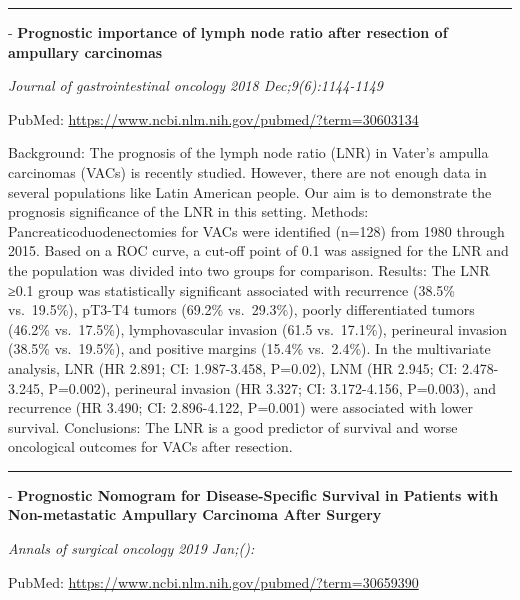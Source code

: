 \documentclass[]{article}
\begin{document}
{}

{}

\begin{center}\rule{0.5\linewidth}{\linethickness}\end{center}

 - \textbf{Prognostic importance of lymph node ratio after resection of
ampullary carcinomas}

\emph{Journal of gastrointestinal oncology 2018 Dec;9(6):1144-1149}

PubMed: \url{https://www.ncbi.nlm.nih.gov/pubmed/?term=30603134}

Background: The prognosis of the lymph node ratio (LNR) in Vater's
ampulla carcinomas (VACs) is recently studied. However, there are not
enough data in several populations like Latin American people. Our aim
is to demonstrate the prognosis significance of the LNR in this setting.
Methods: Pancreaticoduodenectomies for VACs were identified (n=128) from
1980 through 2015. Based on a ROC curve, a cut-off point of 0.1 was
assigned for the LNR and the population was divided into two groups for
comparison. Results: The LNR ≥0.1 group was statistically significant
associated with recurrence (38.5\% vs.~19.5\%), pT3-T4 tumors (69.2\%
vs.~29.3\%), poorly differentiated tumors (46.2\% vs.~17.5\%),
lymphovascular invasion (61.5 vs.~17.1\%), perineural invasion (38.5\%
vs.~19.5\%), and positive margins (15.4\% vs.~2.4\%). In the
multivariate analysis, LNR (HR 2.891; CI: 1.987-3.458, P=0.02), LNM (HR
2.945; CI: 2.478-3.245, P=0.002), perineural invasion (HR 3.327; CI:
3.172-4.156, P=0.003), and recurrence (HR 3.490; CI: 2.896-4.122,
P=0.001) were associated with lower survival. Conclusions: The LNR is a
good predictor of survival and worse oncological outcomes for VACs after
resection.

{}

{}

\begin{center}\rule{0.5\linewidth}{\linethickness}\end{center}

 - \textbf{Prognostic Nomogram for Disease-Specific Survival in Patients
with Non-metastatic Ampullary Carcinoma After Surgery}

\emph{Annals of surgical oncology 2019 Jan;():}

PubMed: \url{https://www.ncbi.nlm.nih.gov/pubmed/?term=30659390}
\end{document}
